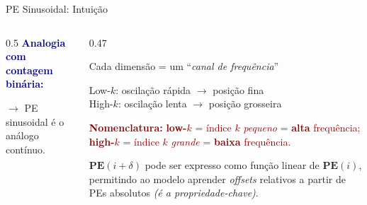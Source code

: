\documentclass[aspectratio=169, xcolor=dvipsnames]{beamer}
\begin{document}
  \begin{frame}{PE Sinusoidal: Intuição}
    \begin{columns}
      \begin{column}{0.5\textwidth}
        \textcolor{DarkBlue}{\textbf{Analogia com contagem binária:}}

        \vspace{0.3em}

        \vspace{0.5em}
        $\to$ PE sinusoidal é o análogo contínuo.
      \end{column}
      \begin{column}{0.47\textwidth}
        {\small
        Cada dimensão = um ``\textit{canal de frequência}''

        \vspace{0.3em}
        Low-$k$: oscilação rápida $\to$ posição fina\\
        High-$k$: oscilação lenta $\to$ posição grosseira

        \vspace{0.4em}
        \textcolor{DarkRed}{\textbf{Nomenclatura:} \textbf{low-$k$} = índice $k$ \textit{pequeno} = \textbf{alta} frequência; \textbf{high-$k$} = índice $k$ \textit{grande} = \textbf{baixa} frequência.}
        }

        \vspace{0.5em}
        $\mathbf{PE}(i+\delta)$ pode ser expresso como função linear de $\mathbf{PE}(i)$, permitindo ao modelo aprender \textit{offsets} relativos a partir de PEs absolutos \textit{(é a propriedade-chave)}.
      \end{column}
    \end{columns}
  \end{frame}
\end{document}
